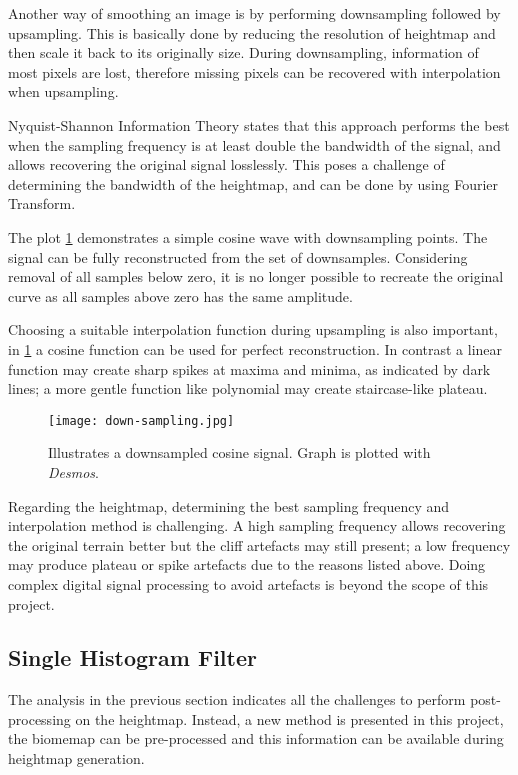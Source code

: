 \documentclass[oneside, a4paper]{report}
\begin{document}
    Another way of smoothing an image is by performing downsampling followed by upsampling. This is basically done by reducing the resolution of heightmap and then scale it back to its originally size. During downsampling, information of most pixels are lost, therefore missing pixels can be recovered with interpolation when upsampling.

    Nyquist-Shannon Information Theory \cite{shannon_theorem} states that this approach performs the best when the sampling frequency is at least double the bandwidth of the signal, and allows recovering the original signal losslessly. This poses a challenge of determining the bandwidth of the heightmap, and can be done by using Fourier Transform.

    The plot \ref{downsample_cos} demonstrates a simple cosine wave with downsampling points. The signal can be fully reconstructed from the set of downsamples. Considering removal of all samples below zero, it is no longer possible to recreate the original curve as all samples above zero has the same amplitude.

    Choosing a suitable interpolation function during upsampling is also important, in \ref{downsample_cos} a cosine function can be used for perfect reconstruction. In contrast a linear function may create sharp spikes at maxima and minima, as indicated by dark lines; a more gentle function like polynomial may create staircase-like plateau.

    \begin{figure}[H]
        \texttt{[image: down-sampling.jpg]}
        \caption{Illustrates a downsampled cosine signal. Graph is plotted with \textit{Desmos}.}
        \label{downsample_cos}
    \end{figure}

    Regarding the heightmap, determining the best sampling frequency and interpolation method is challenging. A high sampling frequency allows recovering the original terrain better but the cliff artefacts may still present; a low frequency may produce plateau or spike artefacts due to the reasons listed above. Doing complex digital signal processing to avoid artefacts is beyond the scope of this project.

    \subsection{Single Histogram Filter}

    The analysis in the previous section indicates all the challenges to perform post-processing on the heightmap. Instead, a new method is presented in this project, the biomemap can be pre-processed and this information can be available during heightmap generation.
\end{document}
